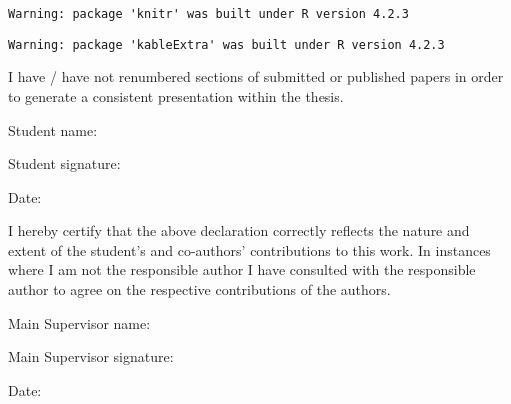 \documentclass{uniexeterthesis}
\begin{document}
\begin{verbatim}
Warning: package 'knitr' was built under R version 4.2.3
\end{verbatim}

\begin{verbatim}
Warning: package 'kableExtra' was built under R version 4.2.3
\end{verbatim}

\begingroup\fontsize{10}{12}\selectfont

\endgroup{}

I have / have not renumbered sections of submitted or published papers
in order to generate a consistent presentation within the thesis.

Student name:

Student signature:

Date:

I hereby certify that the above declaration correctly reflects the
nature and extent of the student's and co-authors' contributions to this
work. In instances where I am not the responsible author I have
consulted with the responsible author to agree on the respective
contributions of the authors.

Main Supervisor name:

Main Supervisor signature:

Date:
\end{document}
